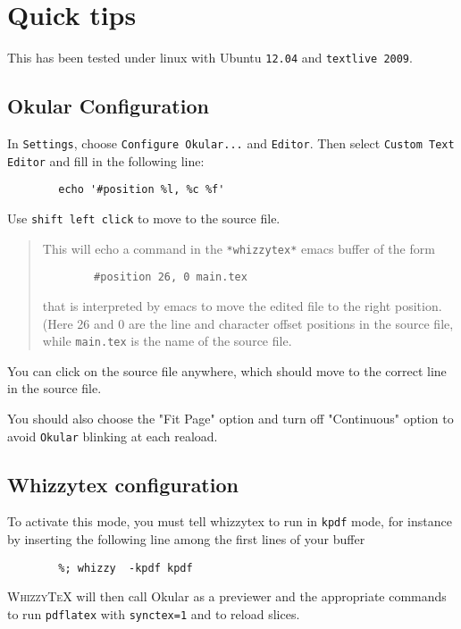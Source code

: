 \documentclass{article}
\providecommand {\WhizzyTeX}{\textsc{WhizzyTeX}}
\begin{document}
\begin{abstract}
This example is used to illustrate, test and expalin how to run {\WhizzyTeX}
with the Okular pdf previewer. 
\end{abstract}

\tableofcontents

\section{Quick tips}

This has been tested under linux with Ubuntu \verb"12.04"
and \verb"textlive 2009".

\subsection{Okular Configuration}


In \verb"Settings", choose \verb"Configure Okular..."  and \verb"Editor".
Then select \verb"Custom Text Editor" and fill in the following line:
\begin{verbatim}
        echo '#position %l, %c %f'
\end{verbatim}
Use \texttt{shift left click} to move to the source file.
\begin{quote}\small
This will echo a command in the \verb"*whizzytex*" emacs buffer of the form
\begin{verbatim}
        #position 26, 0 main.tex
\end{verbatim}
that is interpreted by emacs to move the edited file to the right position.
(Here 26 and 0 are the line and character offset positions in the source
file, while \verb"main.tex" is the name of the source file.
\end{quote}
You can click on the source file anywhere, which should move to the 
correct line in the source file.

You should also choose the "Fit Page" option and turn off "Continuous" 
option to avoid \texttt{Okular} blinking at each reaload.

\subsection{Whizzytex configuration}

To activate this mode, you must tell whizzytex to run in \texttt{kpdf} mode,
for instance by inserting the following line among the first lines of your
buffer 
\begin{verbatim}
        %; whizzy  -kpdf kpdf
\end{verbatim}
{\WhizzyTeX} will then call Okular as a previewer and the appropriate 
commands to run \verb"pdflatex" with \verb"synctex=1"
and to reload slices.
\end{document}
